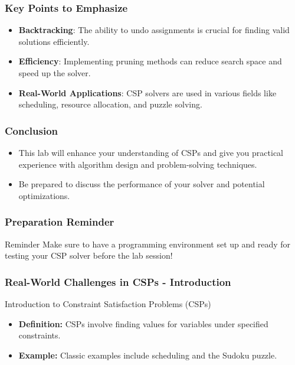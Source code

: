 \documentclass[aspectratio=169]{beamer}
\begin{document}
\begin{frame}
    \frametitle{Key Points to Emphasize}
    \begin{itemize}
        \item \textbf{Backtracking}: The ability to undo assignments is crucial for finding valid solutions efficiently.
        \item \textbf{Efficiency}: Implementing pruning methods can reduce search space and speed up the solver.
        \item \textbf{Real-World Applications}: CSP solvers are used in various fields like scheduling, resource allocation, and puzzle solving.
    \end{itemize}
\end{frame}

\begin{frame}
    \frametitle{Conclusion}
    \begin{itemize}
        \item This lab will enhance your understanding of CSPs and give you practical experience with algorithm design and problem-solving techniques.
        \item Be prepared to discuss the performance of your solver and potential optimizations.
    \end{itemize}
\end{frame}

\begin{frame}
    \frametitle{Preparation Reminder}
    \begin{block}{Reminder}
        Make sure to have a programming environment set up and ready for testing your CSP solver before the lab session!
    \end{block}
\end{frame}

\begin{frame}[fragile]
    \frametitle{Real-World Challenges in CSPs - Introduction}
    \begin{block}{Introduction to Constraint Satisfaction Problems (CSPs)}
        \begin{itemize}
            \item \textbf{Definition:} CSPs involve finding values for variables under specified constraints.
            \item \textbf{Example:} Classic examples include scheduling and the Sudoku puzzle.
        \end{itemize}
    \end{block}
\end{frame}
\end{document}
